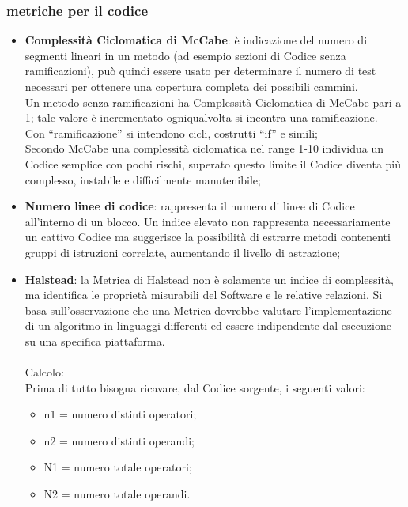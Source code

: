 {\subsubsection{metriche per il codice}{
\label{sec:metrichecodice}
	\begin{itemize}
		\item \textbf{Complessità Ciclomatica di McCabe}: è indicazione del numero di segmenti lineari in un metodo (ad esempio sezioni di Codice senza ramificazioni), può quindi essere usato per determinare il numero di test necessari per ottenere una copertura completa dei possibili cammini.  \\
		Un metodo senza ramificazioni ha Complessità Ciclomatica di McCabe pari a 1; tale valore è incrementato ogniqualvolta si incontra una ramificazione.  \\
		Con “ramificazione” si intendono cicli, costrutti “if” e simili;\\
		Secondo McCabe una complessità ciclomatica nel range 1-10 individua un Codice semplice con pochi rischi, superato questo limite il Codice diventa più complesso, instabile e difficilmente manutenibile;
		
		\item \textbf{Numero linee di codice}: rappresenta il numero di linee di Codice all'interno di un blocco. 
		Un indice elevato non rappresenta necessariamente un cattivo Codice ma suggerisce la possibilità di estrarre metodi contenenti gruppi di istruzioni correlate, aumentando il livello di astrazione;
		
		\item \textbf{Halstead}: la Metrica di Halstead non è solamente un indice di complessità, ma identifica le proprietà misurabili del Software e le relative relazioni. Si basa sull’osservazione che una Metrica dovrebbe	valutare l’implementazione di un algoritmo in linguaggi differenti ed essere indipendente dal esecuzione su una specifica piattaforma.\\\\
		Calcolo:\\
		Prima di tutto bisogna ricavare, dal Codice sorgente, i seguenti valori:
		\begin{itemize}		
		\item n1 = numero distinti operatori;
		\item n2 = numero distinti operandi;
		\item N1 = numero totale operatori;
		\item N2 = numero totale operandi.
		

\end{itemize}
\end{itemize}}}
